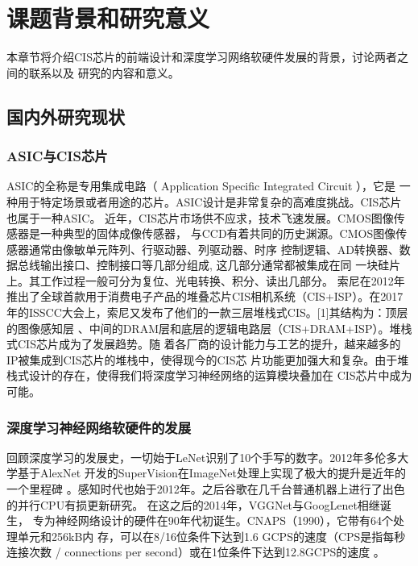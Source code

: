 
\chapter{课题背景和研究意义}

本章节将介绍CIS芯片的前端设计和深度学习网络软硬件发展的背景，讨论两者之间的联系以及
研究的内容和意义。

\section{国内外研究现状}

\subsection{ASIC与CIS芯片}

ASIC的全称是专用集成电路（ Application Specific Integrated Circuit ），它是
一种用于特定场景或者用途的芯片。ASIC设计是非常复杂的高难度挑战。CIS芯片也属于一种ASIC。
近年，CIS芯片市场供不应求，技术飞速发展。CMOS图像传感器是一种典型的固体成像传感器，
与CCD有着共同的历史渊源。CMOS图像传感器通常由像敏单元阵列、行驱动器、列驱动器、时序
控制逻辑、AD转换器、数据总线输出接口、控制接口等几部分组成, 这几部分通常都被集成在同
一块硅片上。其工作过程一般可分为复位、光电转换、积分、读出几部分。  
索尼在2012年推出了全球首款用于消费电子产品的堆叠芯片CIS相机系统（CIS+ISP）。在2017
年的ISSCC大会上，索尼又发布了他们的一款三层堆栈式CIS。[1]其结构为：顶层的图像感知层
、中间的DRAM层和底层的逻辑电路层（CIS+DRAM+ISP）。堆栈式CIS芯片成为了发展趋势。随
着各厂商的设计能力与工艺的提升，越来越多的IP被集成到CIS芯片的堆栈中，使得现今的CIS芯
片功能更加强大和复杂。由于堆栈式设计的存在，使得我们将深度学习神经网络的运算模块叠加在
CIS芯片中成为可能。  

\subsection{深度学习神经网络软硬件的发展}

回顾深度学习的发展史，一切始于LeNet识别了10个手写的数字。2012年多伦多大学基于AlexNet
开发的SuperVision在ImageNet处理上实现了极大的提升是近年的一个里程碑%
。感知时代也始于2012年。之后谷歌在几千台普通机器上进行了出色的并行CPU有损更新研究。
在这之后的2014年，VGGNet与GoogLenet相继诞生，
专为神经网络设计的硬件在90年代初诞生。CNAPS（1990），它带有64个处理单元和256kB内
存，可以在8/16位条件下达到1.6 GCPS的速度（CPS是指每秒连接次数 / connections per
 second）或在1位条件下达到12.8GCPS的速度%
。  

